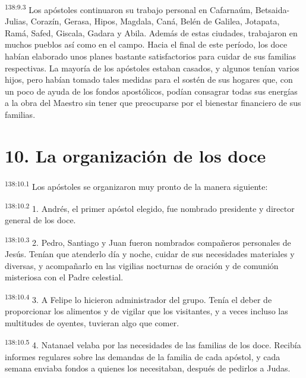 \par
\textsuperscript{138:9.3} Los apóstoles continuaron su trabajo personal en Cafarnaúm, Betsaida-Julias, Corazín, Gerasa, Hipos, Magdala, Caná, Belén de Galilea, Jotapata, Ramá, Safed, Giscala, Gadara y Abila. Además de estas ciudades, trabajaron en muchos pueblos así como en el campo. Hacia el final de este período, los doce habían elaborado unos planes bastante satisfactorios para cuidar de sus familias respectivas. La mayoría de los apóstoles estaban casados, y algunos tenían varios hijos, pero habían tomado tales medidas para el sostén de sus hogares que, con un poco de ayuda de los fondos apostólicos, podían consagrar todas sus energías a la obra del Maestro sin tener que preocuparse por el bienestar financiero de sus familias.

\section*{10. La organización de los doce}
\par
\textsuperscript{138:10.1} Los apóstoles se organizaron muy pronto de la manera siguiente:

\par
\textsuperscript{138:10.2} 1. Andrés, el primer apóstol elegido, fue nombrado presidente y director general de los doce.

\par
\textsuperscript{138:10.3} 2. Pedro, Santiago y Juan fueron nombrados compañeros personales de Jesús. Tenían que atenderlo día y noche, cuidar de sus necesidades materiales y diversas, y acompañarlo en las vigilias nocturnas de oración y de comunión misteriosa con el Padre celestial.

\par
\textsuperscript{138:10.4} 3. A Felipe lo hicieron administrador del grupo. Tenía el deber de proporcionar los alimentos y de vigilar que los visitantes, y a veces incluso las multitudes de oyentes, tuvieran algo que comer.

\par
\textsuperscript{138:10.5} 4. Natanael velaba por las necesidades de las familias de los doce. Recibía informes regulares sobre las demandas de la familia de cada apóstol, y cada semana enviaba fondos a quienes los necesitaban, después de pedirlos a Judas.

